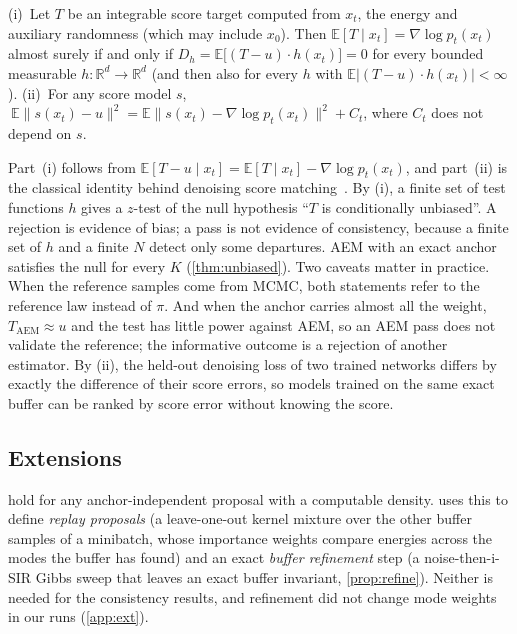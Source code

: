 \begin{proposition}
\label{prop:diag}
(i)~Let $T$ be an integrable score target computed from $x_t$, the energy and auxiliary randomness (which may include $x_0$). Then $\mathbb{E}[T\mid x_t]=\nabla\log p_t(x_t)$ almost surely if and only if
$D_h=\mathbb{E}\big[(T-u)\cdot h(x_t)\big]=0$ for every bounded measurable $h:\mathbb{R}^d\to\mathbb{R}^d$ (and then also for every $h$ with $\mathbb{E}|(T-u)\cdot h(x_t)|<\infty$).
(ii)~For any score model $s$, $\ \mathbb{E}\|s(x_t)-u\|^2=\mathbb{E}\|s(x_t)-\nabla\log p_t(x_t)\|^2+C_t$, where $C_t$ does not depend on $s$.
\end{proposition}
Part~(i) follows from $\mathbb{E}[T-u\mid x_t]=\mathbb{E}[T\mid x_t]-\nabla\log p_t(x_t)$, and part~(ii) is the classical identity behind denoising score matching~\citep{vincent2011connection}.
By (i), a finite set of test functions $h$ gives a $z$-test of the null hypothesis ``$T$ is conditionally unbiased''. A rejection is evidence of bias; a pass is not evidence of consistency, because a finite set of $h$ and a finite $N$ detect only some departures. AEM with an exact anchor satisfies the null for every $K$ (\cref{thm:unbiased}). Two caveats matter in practice. When the reference samples come from MCMC, both statements refer to the reference law instead of $\pi$. And when the anchor carries almost all the weight, $T_{\mathrm{AEM}}\approx u$ and the test has little power against AEM, so an AEM pass does not validate the reference; the informative outcome is a rejection of another estimator. By (ii), the held-out denoising loss of two trained networks differs by exactly the difference of their score errors, so models trained on the same exact buffer can be ranked by score error without knowing the score.

\subsection{Extensions}
\label{sec:ext}
 hold for any anchor-independent proposal with a computable density.  uses this to define \emph{replay proposals} (a leave-one-out kernel mixture over the other buffer samples of a minibatch, whose importance weights compare energies across the modes the buffer has found) and an exact \emph{buffer refinement} step (a noise-then-i-SIR Gibbs sweep that leaves an exact buffer invariant, \cref{prop:refine}). Neither is needed for the consistency results, and refinement did not change mode weights in our runs (\cref{app:ext}).

